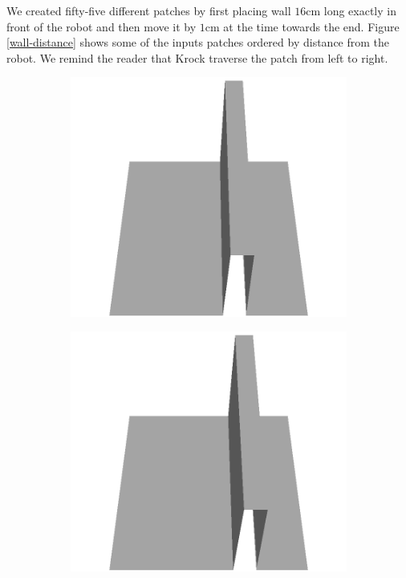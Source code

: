 \documentclass[../document.tex]{subfiles}
\begin{document}
We created fifty-five different patches by first placing wall $16$cm long exactly in front of the robot and then move it by $1$cm at the time towards the end. Figure \ref{wall-distance} shows some of the inputs patches ordered by distance from the robot. We remind the reader that Krock traverse the patch from left to right.
\begin{figure}[htbp]
    \centering
    \begin{subfigure}[b]{0.24\textwidth}
    \includegraphics[width=\linewidth]{../img/5/custom_patches/walls_front/all/00-3d.png}
    \end{subfigure}
    \begin{subfigure}[b]{0.24\textwidth}
    \includegraphics[width=\linewidth]{../img/5/custom_patches/walls_front/all/04-3d.png}

\end{subfigure}
\end{figure}
\end{document}
